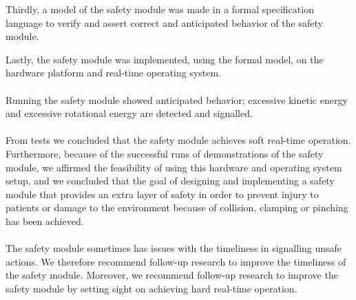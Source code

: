 \documentclass[12pt]{scrreprt}
\begin{document}
\par
Thirdly, a model of the safety module was made in a formal specification language to verify and assert correct and anticipated behavior of the safety module.
\par
Lastly, the safety module was implemented, using the formal model, on the hardware platform and real-time operating system.
\\\\
Running the safety module showed anticipated behavior; excessive kinetic energy and excessive rotational energy are detected and signalled.
\\\\
From tests we concluded that the safety module achieves soft real-time operation. Furthermore, because of the successful runs of demonstrations of the safety module, we affirmed the feasibility of using this hardware and operating system setup, and we concluded that  the goal of designing and implementing a safety module that provides an extra layer of safety in order to prevent injury to patients or damage to the environment because of collision, clamping or pinching has been achieved.
\\\\
The safety module sometimes has issues with the timeliness in signalling unsafe actions. We therefore recommend follow-up research to improve the timeliness of the safety module. Moreover, we recommend follow-up research to improve the safety module by setting sight on achieving hard real-time operation.
\end{document}
